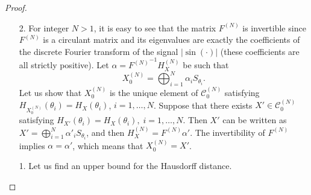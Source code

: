 \documentclass[numbers,compress,v1.0.1]{vmsta}
\theoremstyle{definition}
\begin{document}
\begin{proof}
$\:$
%
\begin{enumerate}
%
\item[2.] For integer $N>1$, it is easy to see that the matrix
$F^{(N)}$ is invertible since $F^{(N)}$ is a circulant matrix \cite
{CirculantMatrix} and its eigenvalues are exactly the coefficients of
the discrete Fourier transform \cite{sundararajan2001discreteFourier}
of the signal $\vert\sin(\cdot)\vert$ (these coefficients are all
strictly positive).
Let $\alpha= {F^{(N)}}^{-1}H^{(N)}_X$ be such that
%
\begin{equation*}
X_0^{(N)}=\bigoplus^N_{i=1}
\alpha_i S_{\theta_i}.
\end{equation*}
%
Let us show that $X_0^{(N)}$ is the unique element of $\mathcal
{C}^{(N)}_0$ satisfying $H_{X_0^{(N)}}(\theta_i)=H_X(\theta_i)$, $
i=1,\dots,N $.
Suppose that there exists $X'\in\mathcal{C}^{(N)}_0$ satisfying
$H_{X'}(\theta_i)=H_X(\theta_i),\; i=1,\dots,N $. Then $X'$ can be
written as $X'=\bigoplus^N_{i=1}\alpha'_i S_{\theta_i}$, and then
$H^{(N)}_{X}={F^{(N)}}\alpha' $. The invertibility of $F^{(N)}$
implies $\alpha=\alpha'$, which means that $X_0^{(N)}=X'$.

\item[1.] Let us find an upper bound for the Hausdorff distance.


\end{enumerate}
\end{proof}
\end{document}
